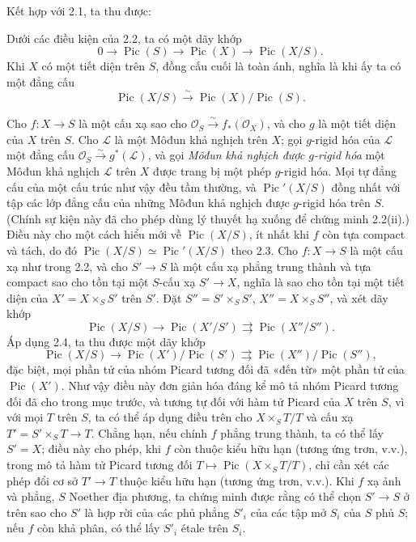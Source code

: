 Kết hợp với 2.1, ta thu được:

 Dưới các điều kiện của 2.2, ta có một dãy khớp
\[
0\longrightarrow\operatorname{Pic}(S)\longrightarrow\operatorname{Pic}(X)
\longrightarrow\operatorname{Pic}(X/S).
\]
Khi $X$ có một tiết diện trên $S$, đồng cấu cuối là toàn ánh, nghĩa là khi ấy
ta có một đẳng cấu
\[
\operatorname{Pic}(X/S)\xrightarrow{\sim}
\operatorname{Pic}(X)/\operatorname{Pic}(S).
\]

 Cho $f:X\longrightarrow S$ là một cấu xạ sao cho
$\mathcal O_S\xrightarrow{\sim}f_*(\mathcal O_X)$, và cho $g$ là một tiết
diện của $X$ trên $S$. Cho $\mathcal L$ là một Môđun khả nghịch trên $X$; gọi
$g$-rigid hóa của $\mathcal L$ một đẳng cấu
$\mathcal O_S\xrightarrow{\sim}g^*(\mathcal L)$, và gọi
\emph{Môđun khả nghịch được $g$-rigid hóa} một Môđun khả nghịch $\mathcal L$
trên $X$ được trang bị một phép $g$-rigid hóa. Mọi tự đẳng cấu của một cấu
trúc như vậy đều tầm thường, và
$\operatorname{Pic}'(X/S)$ đồng nhất với tập các lớp đẳng cấu của những Môđun
khả nghịch được $g$-rigid hóa trên $S$. (Chính sự kiện này đã cho phép dùng lý thuyết hạ
xuống để chứng minh 2.2(ii).) Điều này cho một cách hiểu mới về
$\operatorname{Pic}(X/S)$, ít nhất khi $f$ còn tựa compact và tách, do đó
$\operatorname{Pic}(X/S)\simeq\operatorname{Pic}'(X/S)$ theo 2.3.
 Cho $f:X\longrightarrow S$ là một cấu xạ như trong
2.2, và cho $S'\longrightarrow S$ là một cấu xạ phẳng trung thành và tựa
compact sao cho tồn tại một $S$-cấu xạ $S'\longrightarrow X$, nghĩa là sao cho
tồn tại một tiết diện của $X'=X\times_SS'$ trên $S'$. Đặt
$S''=S'\times_SS'$, $X''=X\times_SS''$, và xét dãy khớp
\[
\operatorname{Pic}(X/S)\longrightarrow\operatorname{Pic}(X'/S')
\rightrightarrows\operatorname{Pic}(X''/S'').
\]
Áp dụng 2.4, ta thu được một dãy khớp
\[
\operatorname{Pic}(X/S)\longrightarrow
\operatorname{Pic}(X')/\operatorname{Pic}(S')
\rightrightarrows
\operatorname{Pic}(X'')/\operatorname{Pic}(S''),
\]
đặc biệt, mọi phần tử của nhóm Picard tương đối đã «đến từ» một phần tử của
$\operatorname{Pic}(X')$. Như vậy điều này đơn giản hóa đáng kể mô tả nhóm
Picard tương đối đã cho trong mục trước, và tương tự đối với hàm tử Picard của
$X$ trên $S$, vì với mọi $T$ trên $S$, ta có thể áp dụng điều trên cho
$X\times_ST/T$ và cấu xạ $T'=S'\times_ST\longrightarrow T$. Chẳng hạn, nếu
chính $f$ phẳng trung thành, ta có thể lấy $S'=X$; điều này cho phép, khi $f$
còn thuộc kiểu hữu hạn (tương ứng trơn, v.v.), trong mô tả hàm tử Picard tương
đối $T\longmapsto\operatorname{Pic}(X\times_ST/T)$, chỉ cần xét các phép đổi
cơ sở $T'\longrightarrow T$ thuộc kiểu hữu hạn (tương ứng trơn, v.v.). Khi
$f$ xạ ảnh và phẳng, $S$ Noether địa phương, ta chứng minh được rằng có thể
chọn $S'\longrightarrow S$ ở trên sao cho $S'$ là hợp rời của các phủ phẳng
$S'_i$ của các tập mở $S_i$ của $S$ phủ $S$; nếu $f$ còn khả phân, có thể lấy $S'_i$
étale trên $S_i$.

